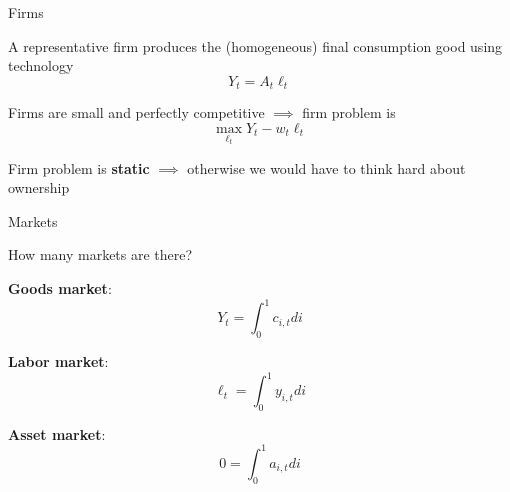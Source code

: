 \documentclass[11pt, aspectratio=169]{beamer}
\newenvironment{witemize}{\itemize\addtolength{\itemsep}{10pt}}{\enditemize}
\begin{document}
\begin{frame}{Firms}

\begin{witemize}
\item A representative firm produces the (homogeneous) final consumption good using technology 
\begin{equation*}
	Y_t = A_t \ell_t
\end{equation*}

\item Firms are small and perfectly competitive $\implies$ firm problem is
\begin{equation*}
	\max_{\ell_t} Y_t - w_t \ell_t
\end{equation*}

\item Firm problem is \textbf{static} $\implies$ otherwise we would have to think hard about ownership
\end{witemize}

\end{frame}


\begin{frame}{Markets}

How many markets are there?

\pause
\vspace{4mm}
\noindent
\textbf{Goods market}:
\begin{equation*}
	Y_t = \int_0^1 c_{i, t} di
\end{equation*}


\vspace{4mm}
\noindent
\textbf{Labor market}:
\begin{equation*}
	\ell_t = \int_0^1 y_{i, t} di
\end{equation*}

\vspace{4mm}
\noindent
\textbf{Asset market}:
\begin{equation*}
	0 = \int_0^1 a_{i, t} di
\end{equation*}

\end{frame}
\end{document}
